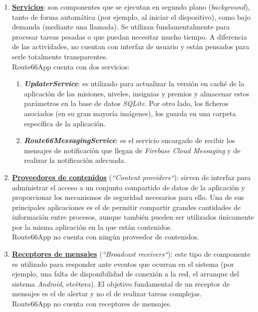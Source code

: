 \documentclass[twoside]{report}
\begin{document}
\begin{enumerate}
\item \textbf{\underline{Servicios}}: son componentes que se ejecutan en segundo plano (\textit{background}), tanto de forma automática (por ejemplo, al iniciar el dispositivo), como bajo demanda (mediante una llamada). Se utilizan fundamentalmente para procesar tareas pesadas o que puedan necesitar mucho tiempo. A diferencia de las actividades, no cuentan con interfaz de usuario y están pensados para serle totalmente transparentes.\\
Route66App cuenta con dos servicios:
	\begin{enumerate}
	\item \textbf{\textit{UpdaterService}}: es utilizado para actualizar la versión en caché de la aplicación de las misiones, niveles, insignias y premios y almacenar estos parámetros en la base de datos \textit{SQLite}. Por otro lado, los ficheros asociados (en su gran mayoría imágenes), los guarda en una carpeta específica de la aplicación.
	
	\item \textbf{\textit{Route66MessagingService}}: es el servicio encargado de recibir los mensajes de notificación que llegan de \textit{Firebase Cloud Messaging} y de realizar la notificación adecuada.
	\end{enumerate}

\item \textbf{\underline{Proveedores de contenidos}} (\textit{“Content providers“}): sirven de interfaz para administrar el acceso a un conjunto compartido de datos de la aplicación y proporcionar los mecanismos de seguridad necesarios para ello. Una de sus principales aplicaciones es el de permitir compartir grandes cantidades de información entre procesos, aunque también pueden ser utilizados únicamente por la misma aplicación en la que están contenidos.\\
Route66App no cuenta con ningún proveedor de contenidos.

\item \textbf{\underline{Receptores de mensajes}} (\textit{“Broadcast receivers“}): este tipo de componente es utilizado para responder ante eventos que ocurran en el sistema (por ejemplo, una falta de disponibilidad de conexión a la red, el arranque del sistema \textit{Android}, etcétera). El objetivo fundamental de un receptor de mensajes es el de alertar y no el de realizar tareas complejas. \\
Route66App no cuenta con receptores de mensajes.
\end{enumerate}
\end{document}
